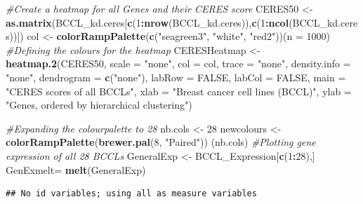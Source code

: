 \documentclass[]{article}
\newenvironment{Shaded}{\begin{snugshade}}{\end{snugshade}}
\newcommand{\CommentTok}[1]{\textcolor[rgb]{0.56,0.35,0.01}{\textit{#1}}}
\newcommand{\DataTypeTok}[1]{\textcolor[rgb]{0.13,0.29,0.53}{#1}}
\newcommand{\DecValTok}[1]{\textcolor[rgb]{0.00,0.00,0.81}{#1}}
\newcommand{\KeywordTok}[1]{\textcolor[rgb]{0.13,0.29,0.53}{\textbf{#1}}}
\newcommand{\NormalTok}[1]{#1}
\newcommand{\OperatorTok}[1]{\textcolor[rgb]{0.81,0.36,0.00}{\textbf{#1}}}
\newcommand{\OtherTok}[1]{\textcolor[rgb]{0.56,0.35,0.01}{#1}}
\newcommand{\StringTok}[1]{\textcolor[rgb]{0.31,0.60,0.02}{#1}}
\begin{document}
\begin{Shaded}
\begin{Highlighting}[]
\CommentTok{#Create a heatmap for all Genes and their CERES score}
\NormalTok{CERES50 <-}\StringTok{ }\KeywordTok{as.matrix}\NormalTok{(BCCL_kd.ceres[}\KeywordTok{c}\NormalTok{(}\DecValTok{1}\OperatorTok{:}\KeywordTok{nrow}\NormalTok{(BCCL_kd.ceres)),}\KeywordTok{c}\NormalTok{(}\DecValTok{1}\OperatorTok{:}\KeywordTok{ncol}\NormalTok{(BCCL_kd.ceres))])}
\NormalTok{col <-}\StringTok{ }\KeywordTok{colorRampPalette}\NormalTok{(}\KeywordTok{c}\NormalTok{(}\StringTok{"seagreen3"}\NormalTok{, }\StringTok{"white"}\NormalTok{, }\StringTok{"red2"}\NormalTok{))(}\DataTypeTok{n =} \DecValTok{1000}\NormalTok{) }\CommentTok{#Defining the colours for the heatmap}
\NormalTok{CERESHeatmap <-}\StringTok{ }\KeywordTok{heatmap.2}\NormalTok{(CERES50, }\DataTypeTok{scale =} \StringTok{"none"}\NormalTok{, }\DataTypeTok{col =}\NormalTok{ col, }
          \DataTypeTok{trace =} \StringTok{"none"}\NormalTok{, }\DataTypeTok{density.info =} \StringTok{"none"}\NormalTok{, }\DataTypeTok{dendrogram =} \KeywordTok{c}\NormalTok{(}\StringTok{"none"}\NormalTok{), }\DataTypeTok{labRow =} \OtherTok{FALSE}\NormalTok{, }\DataTypeTok{labCol =} \OtherTok{FALSE}\NormalTok{, }\DataTypeTok{main =} \StringTok{"CERES scores of all BCCLs"}\NormalTok{, }\DataTypeTok{xlab =} \StringTok{"Breast cancer cell lines (BCCL)"}\NormalTok{, }\DataTypeTok{ylab =} \StringTok{"Genes, ordered by hierarchical clustering"}\NormalTok{)}
\end{Highlighting}
\end{Shaded}

\begin{Shaded}
\begin{Highlighting}[]
\CommentTok{#Expanding the colourpalette to 28}
\NormalTok{nb.cols <-}\StringTok{ }\DecValTok{28} 
\NormalTok{newcolours <-}\StringTok{ }\KeywordTok{colorRampPalette}\NormalTok{(}\KeywordTok{brewer.pal}\NormalTok{(}\DecValTok{8}\NormalTok{, }\StringTok{"Paired"}\NormalTok{)) (nb.cols)}
\CommentTok{#Plotting gene expression of all 28 BCCLs}
\NormalTok{GeneralExp <-}\StringTok{ }\NormalTok{BCCL_Expression[}\KeywordTok{c}\NormalTok{(}\DecValTok{1}\OperatorTok{:}\DecValTok{28}\NormalTok{),]}
\NormalTok{GenExmelt=}\StringTok{ }\KeywordTok{melt}\NormalTok{(GeneralExp)}
\end{Highlighting}
\end{Shaded}

\begin{verbatim}
## No id variables; using all as measure variables
\end{verbatim}
\end{document}
